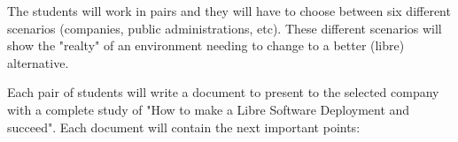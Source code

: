 \documentclass[a4paper]{article}
\begin{document}
The students will work in pairs and they will have to choose between six different scenarios (companies, public administrations, etc). These different scenarios will show the "realty" of an environment needing to change to a better (libre) alternative. 

Each pair of students will write a document to present to the selected company with a complete study of "How to make a Libre Software Deployment and succeed". Each document will contain the next important points:



\end{document}
